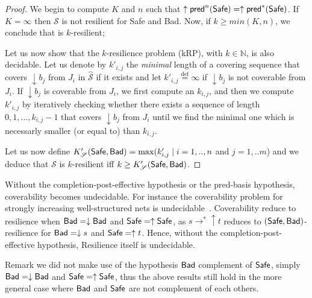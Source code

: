 	\begin{proof}

We begin to compute $K$ and $n$ such that $ \uparrow \textsf{pred}^n(\textsf{Safe})=  \uparrow \textsf{pred}^*(\textsf{Safe})$.
If $K=\infty$ then $\mathscr{S}$ is not resilient for Safe and Bad.
Now, if $k \geq min(K,n)$, we conclude that is $k$-resilient; 
\fi

Let us now show that the $k$-resilience problem (kRP), with $k \in \mathbb{N}$, is also decidable.
Let us denote by $k'_{i,j}$ the \emph{minimal} length of a covering sequence that covers $\downarrow b_j$ from $J_i$ in $\hat{\mathscr{S}}$ if it exists and let $k'_{i,j}\stackrel{\text{def}}{=}\infty$ if $\downarrow b_j$ is not coverable from $J_i$. 
If $\downarrow b_j$ is coverable from $J_i$, we first compute an $k_{i,j}$, and then we compute $k'_{i,j}$ by iteratively checking whether there exists a sequence of length $0,1,...,k_{i,j}-1$ that covers $\downarrow b_j$ from $J_i$ until we find the minimal one which is necessarly smaller (or equal to) than $k_{i,j}$.

Let us now define $K'_{\mathscr{S}}(\textsf{Safe},\textsf{Bad})=\max(k'_{i,j} \mid i=1,..,n$ and $j= 1,..m$) and we deduce that  $\mathscr{S}$ is $k$-resilient iff $k \geq K'_{\mathscr{S}}(\textsf{Safe},\textsf{Bad})$.
\end{proof}

%


Without the completion-post-effective hypothesis or the pred-basis hypothesis, coverability 
becomes undecidable. For instance the coverability problem for strongly increasing well-structured nets is undecidable~\cite{FMP-ic04}. 
Coverability reduce
to resilience when $\textsf{Bad} = \downarrow \textsf{Bad}$ and  $\textsf{Safe} = \uparrow \textsf{Safe}$,
as $s \to^* \uparrow t$ 
reduces to $(\textsf{Safe},\textsf{Bad})$-resilience for $\textsf{Bad} = \downarrow s$ and $\textsf{Safe} = \uparrow t$.
Hence, without the completion-post-effective hypothesis, 
{\sc Resilience} itself is undecidable.

Remark we did not make use of the hypothesis $\textsf{Bad}$ complement of $\textsf{Safe}$, simply 
$\textsf{Bad}=\downarrow \textsf{Bad}$ and $\textsf{Safe}=\uparrow \textsf{Safe}$, thus 
the above results still hold in the more general case where $\textsf{Bad}$ and $\textsf{Safe}$ are not complement of each others.


